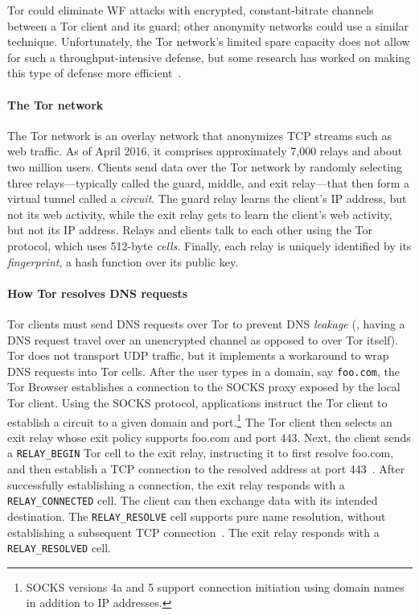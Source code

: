 Tor could eliminate WF
attacks with encrypted, constant-bitrate channels between a Tor client and
its guard; other anonymity networks could use a similar technique.
Unfortunately, the Tor network's limited spare capacity does not 
allow for such a throughput-intensive defense, but some research has
worked on making this type of defense
more efficient~\cite{Cai2014a,DBLP:journals/corr/JuarezIPDW15,WangThesis}.

\paragraph{The Tor network}
The Tor network is an overlay network that anonymizes TCP streams such as web
traffic.  As of April 2016, it comprises approximately 7,000 relays and about two
million users.  Clients send data over the Tor network by randomly selecting
three relays---typically called the guard, middle, and exit relay---that then
form a virtual tunnel called a \emph{circuit}.  The guard relay learns the
client's IP address, but not its web activity, while the exit relay gets to
learn the client's web activity, but not its IP address.  Relays and clients
talk to each other using the Tor protocol, which uses 512-byte \emph{cells}.
Finally, each relay is uniquely identified by its \emph{fingerprint}, a hash
function over its public key.

\paragraph{How Tor resolves DNS requests}
Tor clients must send DNS requests over Tor to prevent DNS {\em leakage}
(\ie, having a
DNS request travel over an unencrypted channel as opposed to over Tor
itself).  Tor does not transport UDP 
traffic, but it implements a workaround to wrap DNS requests into Tor cells.
After the user types in a domain, say {\tt foo.com}, the Tor Browser establishes a
connection to the SOCKS proxy exposed by the local Tor client.  Using the SOCKS
protocol, applications instruct the Tor client to establish a circuit to a given
domain and port.\footnote{SOCKS versions 4a and 5 support connection
initiation using domain names in addition to IP addresses.} The Tor client then
selects an exit relay whose exit policy supports foo.com and port 443.  Next,
the client sends a \texttt{RELAY\_BEGIN} Tor cell to the exit relay, instructing
it to first resolve foo.com, and then establish a TCP connection to the resolved
address at port 443~\cite[\S~6.2]{tor-spec}.  After successfully establishing a
connection, the exit relay responds with a \texttt{RELAY\_CONNECTED}
cell.  The client can then exchange data with its intended 
destination.  The \texttt{RELAY\_RESOLVE} cell supports pure name resolution,
without establishing a subsequent TCP connection~\cite[\S~6.4]{tor-spec}.  The
exit relay responds with a \texttt{RELAY\_RESOLVED} cell.


